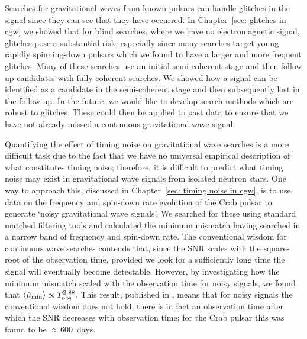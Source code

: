 \documentclass[twoside, 11pt]{thesis}
\begin{document}
Searches for gravitational waves from known pulsars can handle glitches in the
signal since they can see that they have occurred. In Chapter~\ref{sec: glitches in
cgw} we showed that for blind searches, where we have no electromagnetic
signal, glitches pose a substantial risk, especially since many searches target
young rapidly spinning-down pulsars which we found to have a larger and more
frequent glitches. Many of these searches use an initial semi-coherent stage
and then follow up candidates with fully-coherent searches.  We showed how a
signal can be identified as a candidate in the semi-coherent stage and then
subsequently lost in the follow up. In the future, we would like to develop
search methods which are robust to glitches. These could then be applied to
past data to ensure that we have not already missed a continuous gravitational
wave signal.

Quantifying the effect of timing noise on gravitational wave searches is a more
difficult task due to the fact that we have no universal empirical description
of what constitutes timing noise; therefore, it is difficult to predict what
timing noise may exist in gravitational wave signals from isolated neutron
stars.  One way to approach this, discussed in Chapter~\ref{sec: timing noise
in cgw}, is to use data on the frequency and spin-down rate evolution of the
Crab pulsar to generate `noisy gravitational wave signals'.  We searched for
these using standard matched filtering tools and calculated the minimum
mismatch having searched in a narrow band of frequency and spin-down rate. The
conventional wisdom for continuous wave searches contends that, since the SNR
scales with the square-root of the observation time, provided we look for a
sufficiently long time the signal will eventually become detectable.  However,
by investigating how the minimum mismatch scaled with the observation time for
noisy signals, we found that $\langle \tilde{\mu}_{\textrm{min}} \rangle \propto
T_{\mathrm{obs}}^{2.88}$.  This result, published in \citet{Ashton2015}, means that for
noisy signals the conventional wisdom does not hold, there is in fact an
observation time after which the SNR decreases with observation time; for the
Crab pulsar this was found to be $ \approx 600$~days.
\end{document}
